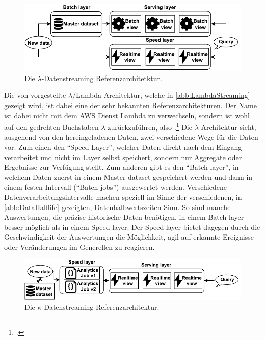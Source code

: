 \begin{figure}[H]
\centering
\includegraphics[width=\textwidth]{graphics/Lambda-Reference-Architecture.pdf}
\caption[Die $\lambda$-Datenstreaming Referenzarchitetktur]{Die $\lambda$-Datenstreaming Referenzarchitetktur.\footnotemark}
\label{abb:LambdaStreaming}
\end{figure}

Die von \citeauthor{Marz.2015} vorgestellte $\lambda$/Lambda-Architektur, welche in \autoref{abb:LambdaStreaming} gezeigt wird, ist dabei eine der sehr bekannten Referenzarchitekturen. 
Der Name ist dabei nicht mit dem \ac{AWS} Dienst Lambda zu verwechseln, sondern ist wohl auf den gedrehten Buchstaben $\lambda$ zurückzuführen, also .\footcite[Vgl. auch im Folgenden][]{Berle.27.11.2017} Die $\lambda$-Architektur sieht, ausgehend von den hereingeladenen Daten, zwei verschiedene Wege für die Daten vor. 
Zum einen den \enquote{Speed Layer}, welcher Daten direkt nach dem Eingang verarbeitet und nicht im Layer selbst speichert, sondern nur Aggregate oder Ergebnisse zur Verfügung stellt. Zum anderen gibt es den \enquote{Batch layer}, in welchem Daten zuerst in einem Master dataset gespeichert werden und dann in einem festen Intervall (\enquote{Batch jobs}) ausgewertet werden. 
Verschiedene Datenverarbeitungsintervalle machen speziell im Sinne der verschiedenen, in \autoref{abb:DataHalflife} gezeigten, Datenhalbwertszeiten Sinn. So sind manche Auswertungen, die präzise historische Daten benötigen, in einem Batch layer besser möglich als in einem Speed layer. Der Speed layer bietet dagegen durch die Geschwindigkeit der Auswertungen die Möglichkeit, agil auf erkannte Ereignisse oder Veränderungen im Generellen zu reagieren.


\begin{figure}[H]
\centering
\includegraphics[width=\textwidth]{graphics/Kappa-Reference-Architecture.pdf}
\caption[Die $\kappa$-Datenstreaming Referenzarchitetktur]{Die $\kappa$-Datenstreaming Referenzarchitektur.\footnotemark}
\label{abb:KappaStreaming}
\end{figure}

